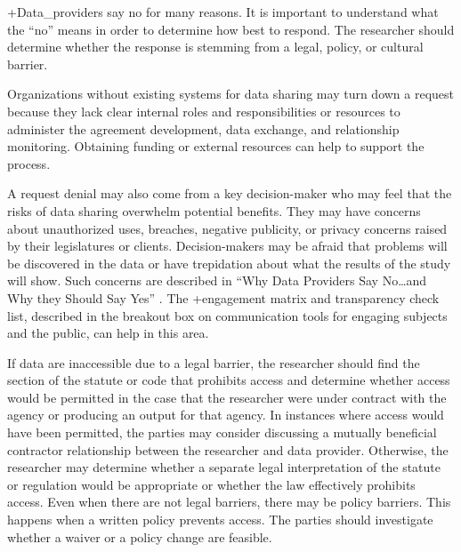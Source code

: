 \documentclass[
]{book}
\begin{document}
+Data\_providers\textbar{} say no for many reasons. It is important to understand what the ``no'' means in order to determine how best to respond. The researcher should determine whether the response is stemming from a legal, policy, or cultural barrier.

Organizations without existing systems for data sharing may turn down a request because they lack clear internal roles and responsibilities or resources to administer the agreement development, data exchange, and relationship monitoring. Obtaining funding or external resources can help to support the process.

A request denial may also come from a key decision-maker who may feel that the risks of data sharing overwhelm potential benefits. They may have concerns about unauthorized uses, breaches, negative publicity, or privacy concerns raised by their legislatures or clients. Decision-makers may be afraid that problems will be discovered in the data or have trepidation about what the results of the study will show. Such concerns are described in ``Why Data Providers Say No\ldots and Why they Should Say Yes'' \citep{nationalneighborhoodindicatorspartnershipnnip2018}. The +engagement\textbar{} matrix and transparency check list, described in the breakout box on communication tools for engaging subjects and the public, can help in this area.

If data are inaccessible due to a legal barrier, the researcher should find the section of the statute or code that prohibits access and determine whether access would be permitted in the case that the researcher were under contract with the agency or producing an output for that agency. In instances where access would have been permitted, the parties may consider discussing a mutually beneficial contractor relationship between the researcher and data provider. Otherwise, the researcher may determine whether a separate legal interpretation of the statute or regulation would be appropriate or whether the law effectively prohibits access. Even when there are not legal barriers, there may be policy barriers. This happens when a written policy prevents access. The parties should investigate whether a waiver or a policy change are feasible.
\end{document}
